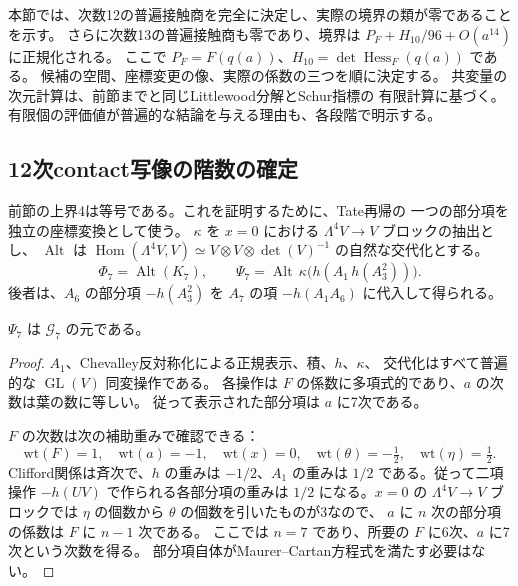 本節では、次数12の普遍接触商を完全に決定し、実際の境界の類が零であることを示す。
さらに次数13の普遍接触商も零であり、境界は
$P_F+H_{10}/96+O(a^{14})$ に正規化される。
ここで $P_F=F(q(a))$、$H_{10}=\det\operatorname{Hess}_F(q(a))$ である。
候補の空間、座標変更の像、実際の係数の三つを順に決定する。
共変量の次元計算は、前節までと同じLittlewood分解とSchur指標の
有限計算\cite{BeteaWheeler,DeBoeckPagetWildon}に基づく。
有限個の評価値が普遍的な結論を与える理由も、各段階で明示する。

\subsection{12次contact写像の階数の確定}
\label{subsec:v10-contact-exact-rank}

前節の上界4は等号である。これを証明するために、Tate再帰の
一つの部分項を独立の座標変換として使う。
$\kappa$ を $x=0$ における $\Lambda^4V\to V$ ブロックの抽出とし、
$\operatorname{Alt}$ は
$\operatorname{Hom}(\Lambda^4V,V)\simeq
V\otimes V\otimes\det(V)^{-1}$ の自然な交代化とする。
\[
 \Phi_7=\operatorname{Alt}(K_7),\qquad
 \Psi_7=\operatorname{Alt}\,\kappa
       \bigl(h(A_1\,h(A_3^2))\bigr).
\]
後者は、$A_6$ の部分項 $-h(A_3^2)$ を
$A_7$ の項 $-h(A_1A_6)$ に代入して得られる。

\begin{lemma}[部分項の同変性と次数]
$\Psi_7$ は $\mathcal G_7$ の元である。
\end{lemma}
\begin{proof}
$A_1$、Chevalley反対称化による正規表示、積、$h$、$\kappa$、
交代化はすべて普遍的な $\operatorname{GL}(V)$ 同変操作である。
各操作は $F$ の係数に多項式的であり、$a$ の次数は葉の数に等しい。
従って表示された部分項は $a$ に7次である。

$F$ の次数は次の補助重みで確認できる：
\[
 \mathrm{wt}(F)=1,\quad\mathrm{wt}(a)=-1,\quad
 \mathrm{wt}(x)=0,\quad
 \mathrm{wt}(\theta)=-\tfrac12,\quad
 \mathrm{wt}(\eta)=\tfrac12.
\]
Clifford関係は斉次で、$h$ の重みは $-1/2$、$A_1$ の重みは
$1/2$ である。従って二項操作 $-h(UV)$ で作られる各部分項の重みは
$1/2$ になる。$x=0$ の $\Lambda^4V\to V$ ブロックでは
$\eta$ の個数から $\theta$ の個数を引いたものが3なので、
$a$ に $n$ 次の部分項の係数は $F$ に $n-1$ 次である。
ここでは $n=7$ であり、所要の $F$ に6次、$a$ に7次という次数を得る。
部分項自体がMaurer--Cartan方程式を満たす必要はない。
\end{proof}


